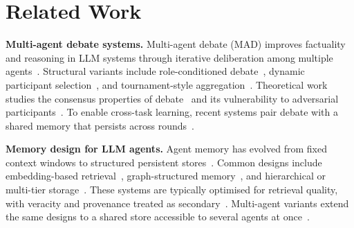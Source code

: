 

\section{Related Work}
\label{sec:related}

\textbf{Multi-agent debate systems.}
Multi-agent debate (MAD) improves factuality and reasoning in LLM systems through iterative deliberation among multiple agents~\citep{chan2023chateval,du2024improving,liang2024encouraging,wang2024rethinking,xiong2023examining}. Structural variants include role-conditioned debate~\citep{chan2023chateval,wang2024unleashing}, dynamic participant selection~\citep{chen2023agentverse,liu2023dynamic}, and tournament-style aggregation~\citep{khan2024debating,zhou2024zodiac}. Theoretical work studies the consensus properties of debate~\citep{smit2023should,zhang2023exploring} and its vulnerability to adversarial participants~\citep{amayuelas2024multiagent,li2024survey}. To enable cross-task learning, recent systems pair debate with a shared memory that persists across rounds~\citep{hong2023metagpt,qian2024scaling,zhang2025g}.

\textbf{Memory design for LLM agents.}
Agent memory has evolved from fixed context windows to structured persistent stores~\citep{packer2023memgpt,park2023generative,zhong2024memorybank}. Common designs include embedding-based retrieval~\citep{shinn2023reflexion,wang2023voyager,zhong2024memorybank}, graph-structured memory~\citep{chhikara2025mem0,rasmussen2025zep}, and hierarchical or multi-tier storage~\citep{packer2023memgpt,wang2025mirix,xu2025mem}. These systems are typically optimised for retrieval quality, with veracity and provenance treated as secondary~\citep{sumers2023cognitive,wu2025human,zhang2025survey}. Multi-agent variants extend the same designs to a shared store accessible to several agents at once~\citep{qian2024scaling,rezazadeh2025collaborative,zhang2025g}.

